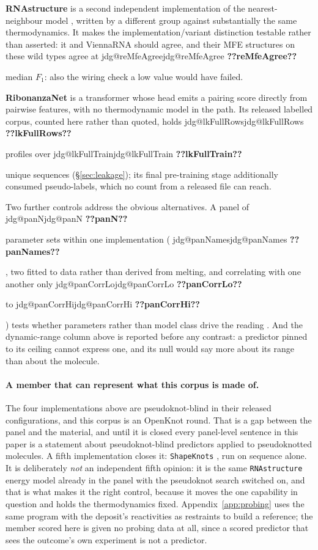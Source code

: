\documentclass[11pt]{article}
\makeatletter
\newcommand{\jdg}[1]{%
  \ifcsname jdg@#1\endcsname\csname jdg@#1\endcsname
  \else\textbf{??#1??}\PackageError{nm}{undefined measured quantity #1}{}\fi}
\makeatother
\begin{document}
\textbf{RNAstructure} is a second independent implementation of the nearest-neighbour model
\citep{reuter2010rnastructure}, written by a different group against substantially the same
thermodynamics. It makes the implementation/variant distinction testable rather than asserted: it
and ViennaRNA should agree, and their MFE structures on these wild types agree at \jdg{reMfeAgree}
median $F_1$: also the wiring check a low value would have failed.

\textbf{RibonanzaNet} is a transformer \citep{ribonanzanet2024} whose head emits a pairing score
directly from pairwise features, with no thermodynamic model in the path. Its released labelled
corpus, counted here rather than quoted, holds \jdg{lkFullRows} profiles over \jdg{lkFullTrain}
unique sequences (\S\ref{sec:leakage}); its final pre-training stage additionally consumed
pseudo-labels, which no count from a released file can reach.

Two further controls address the obvious alternatives. A panel of \jdg{panN} parameter sets within
one implementation (\jdg{panNames}, two fitted to data rather than derived from melting, and
correlating with one another only \jdg{panCorrLo} to \jdg{panCorrHi}) tests whether parameters
rather than model class drive the reading \citep{andronescu2007efficient,mathews1999expanded}. And
the dynamic-range column above is reported before any contrast: a predictor pinned to its ceiling
cannot express one, and its null would say more about its range than about the molecule.

\paragraph{A member that can represent what this corpus is made of.} The four implementations
above are pseudoknot-blind in their released configurations, and this corpus is an OpenKnot round.
That is a gap between the panel and the material, and until it is closed every panel-level sentence
in this paper is a statement about pseudoknot-blind predictors applied to pseudoknotted molecules.
A fifth implementation closes it: \texttt{ShapeKnots} \citep{hajdin2013accurate}, run on sequence
alone. It is deliberately \emph{not} an independent fifth opinion: it is the same
\texttt{RNAstructure} energy model already in the panel with the pseudoknot search switched on, 
and that is what makes it the right control, because it moves the one capability in question and
holds the thermodynamics fixed. Appendix~\ref{app:probing} uses the same program with the
deposit's reactivities as restraints to build a reference; the member scored here is given no
probing data at all, since a scored predictor that sees the outcome's own experiment is not a
predictor.
\end{document}
